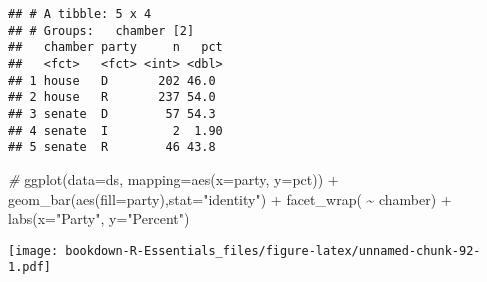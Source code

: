 \documentclass[
]{book}
\newenvironment{Shaded}{\begin{snugshade}}{\end{snugshade}}
\newcommand{\AttributeTok}[1]{\textcolor[rgb]{0.77,0.63,0.00}{#1}}
\newcommand{\CommentTok}[1]{\textcolor[rgb]{0.56,0.35,0.01}{\textit{#1}}}
\newcommand{\FunctionTok}[1]{\textcolor[rgb]{0.00,0.00,0.00}{#1}}
\newcommand{\NormalTok}[1]{#1}
\newcommand{\SpecialCharTok}[1]{\textcolor[rgb]{0.00,0.00,0.00}{#1}}
\newcommand{\StringTok}[1]{\textcolor[rgb]{0.31,0.60,0.02}{#1}}
\begin{document}
\begin{verbatim}
## # A tibble: 5 x 4
## # Groups:   chamber [2]
##   chamber party     n   pct
##   <fct>   <fct> <int> <dbl>
## 1 house   D       202 46.0 
## 2 house   R       237 54.0 
## 3 senate  D        57 54.3 
## 4 senate  I         2  1.90
## 5 senate  R        46 43.8
\end{verbatim}

\begin{Shaded}
\begin{Highlighting}[]
\CommentTok{\#}
\FunctionTok{ggplot}\NormalTok{(}\AttributeTok{data=}\NormalTok{ds, }\AttributeTok{mapping=}\FunctionTok{aes}\NormalTok{(}\AttributeTok{x=}\NormalTok{party, }\AttributeTok{y=}\NormalTok{pct)) }\SpecialCharTok{+} 
  \FunctionTok{geom\_bar}\NormalTok{(}\FunctionTok{aes}\NormalTok{(}\AttributeTok{fill=}\NormalTok{party),}\AttributeTok{stat=}\StringTok{"identity"}\NormalTok{) }\SpecialCharTok{+}
  \FunctionTok{facet\_wrap}\NormalTok{( }\SpecialCharTok{\textasciitilde{}}\NormalTok{ chamber) }\SpecialCharTok{+}
  \FunctionTok{labs}\NormalTok{(}\AttributeTok{x=}\StringTok{"Party"}\NormalTok{, }\AttributeTok{y=}\StringTok{"Percent"}\NormalTok{)}
\end{Highlighting}
\end{Shaded}

\texttt{[image: bookdown-R-Essentials\_files/figure-latex/unnamed-chunk-92-1.pdf]}
\end{document}
